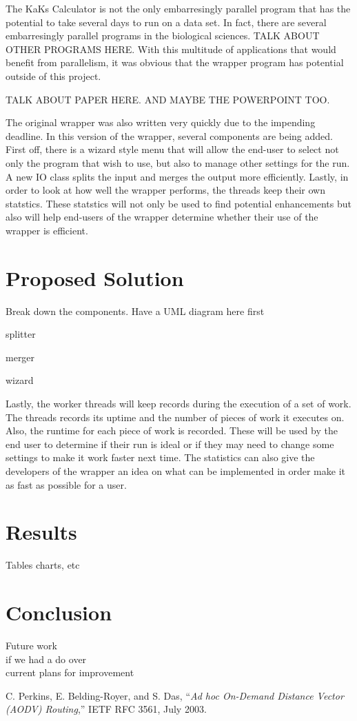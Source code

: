 \documentclass[12pt]{article}
\begin{document}
The KaKs Calculator is not the only embarresingly parallel program that has the
potential to take several days to run on a data set. In fact, there are several
embarresingly parallel programs in the biological sciences. TALK ABOUT OTHER
PROGRAMS HERE. With this multitude of applications that would benefit from
parallelism, it was obvious that the wrapper program has potential outside of
this project.

TALK ABOUT PAPER HERE. AND MAYBE THE POWERPOINT TOO.

The original wrapper was also written very quickly due to the impending
deadline. In this version of the wrapper, several components are being added.
First off, there is a wizard style menu that will allow the end-user to select
not only the program that wish to use, but also to manage other settings for the
run. A new IO class splits the input and merges the output more 
efficiently. Lastly, in order to look at how well the wrapper performs, 
the threads keep their own statstics. These statstics will not only be used to 
find potential enhancements but also will help end-users of the wrapper
determine whether their use of the wrapper is efficient.

\section{Proposed Solution}

Break down the components. Have a UML diagram here first

splitter

merger

wizard

Lastly, the worker threads will keep records during the execution of a set of 
work. The threads records its uptime and the number of pieces of work it
executes on. Also, the runtime for each piece of work is recorded. These will be
used by the end user to determine if their run is ideal or if they may need to
change some settings to make it work faster next time. The statistics can also
give the developers of the wrapper an idea on what can be implemented in order
make it as fast as possible for a user.

\section{Results}

Tables charts, etc

\section{Conclusion}

Future work \\
if we had a do over\\

current plans for improvement

\begin{thebibliography}{1}

C. Perkins,  E. Belding-Royer, and  S. Das, ``\emph{Ad hoc On-Demand
Distance Vector (AODV) Routing},'' IETF RFC 3561, July 2003.

\end{thebibliography}
\end{document}
